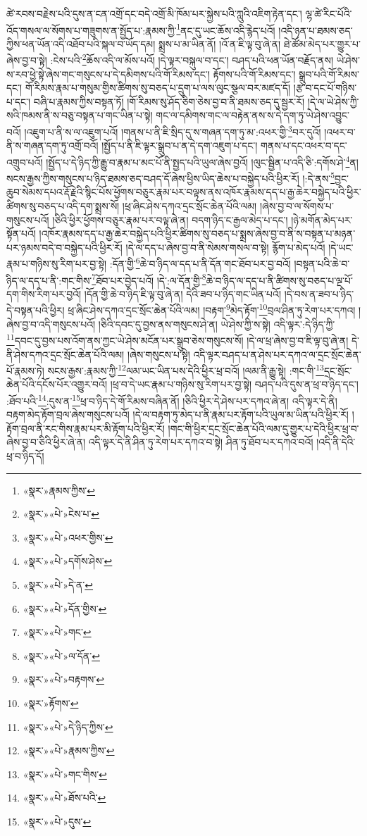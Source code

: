 ཚེ་རབས་བརྗེས་པའི་དུས་ན་ངན་འགྲོ་དང་བདེ་འགྲོ་མི་ཁོམ་པར་སྐྱེས་པའི་ཀླུའི་འཇིག་རྟེན་དང་། ལྷ་ཚེ་རིང་པོའི་འོད་གསལ་ལ་སོགས་པ་གཟུགས་ན་སྤྱོད་པ་:རྣམས་ཀྱི་\footnote{«སྣར་»རྣམས་ཀྱིས་}ནང་དུ་ཡང་ཆོས་འདི་རྙེད་པའོ། །འདི་ཉན་པ་ཐམས་ཅད་ཀྱིས་ཕན་ཡོན་འདི་འཐོབ་པའི་སྐལ་བ་ཡོད་དམ། སྨྲས་པ་མ་ཡིན་ནོ། །འོ་ན་ཇི་ལྟ་བུ་ཞེ་ན། ཐེ་ཚོམ་མེད་པར་གྱུར་པ་ཞེས་བྱ་བ་སྟེ། :ངེས་པའི་\footnote{«སྣར་»«པེ་»ངེས་པ་}ཆོས་འདི་ལ་མོས་པའོ། །དེ་ལྟར་བསྐུལ་བ་དང་། བཤད་པའི་ཕན་ཡོན་བརྗོད་ནས། ཡེ་ཤེས་ས་རབ་ཕྱེ་སྟེ་ཞེས་གང་གསུངས་པ་དེ་དམིགས་པའི་གོ་རིམས་དང་། རྟོགས་པའི་གོ་རིམས་དང་། སྒྲུབ་པའི་གོ་རིམས་དང་། གོ་རིམས་རྣམ་པ་གསུམ་གྱིས་ཚིགས་སུ་བཅད་པ་དྲུག་པ་ལས་ལུང་སྩལ་བར་མཛད་དོ། །རྩ་བ་དང་པོ་གཉིས་པ་དང་། བཞི་པ་རྣམས་ཀྱིས་བསྟན་ཏོ། །གོ་རིམས་སུ་ཤོད་ཅིག་ཅེས་བྱ་བ་ནི་ཐམས་ཅད་དུ་སྦྱར་རོ། །དེ་ལ་ཡེ་ཤེས་ཀྱི་སའི་ཁམས་ནི་ས་བཅུ་བསྟན་པ་གང་ཡིན་པ་སྟེ། གང་ལ་དམིགས་གང་ལ་བརྟེན་ནས་ས་དེ་དག་ཏུ་ཡེ་ཤེས་འབྱུང་བའོ། །འཇུག་པ་ནི་ས་ལ་འཇུག་པའོ། །གནས་པ་ནི་ཇི་སྲིད་དུ་ས་གཞན་དག་ཏུ་མ་:འཕར་གྱི་\footnote{«སྣར་»«པེ་»འཕར་གྱིས་}བར་དུའོ། །འཕར་བ་ནི་ས་གཞན་དག་ཏུ་འགྲོ་བའོ། །སྤྱོད་པ་ནི་ཇི་ལྟར་སྒྲུབ་པ་ན་དེ་དག་འཇུག་པ་དང་། གནས་པ་དང་འཕར་བ་དང་འགྲུབ་པའོ། །སྤྱོད་པ་དེ་ཉིད་ཀྱི་རྒྱུ་བ་རྣམ་པ་མང་པོ་ནི་སྤྱད་པའི་ཡུལ་ཞེས་བྱའོ། །ལུང་སྦྱིན་པ་འདི་ཅི་:དགོས་ཤེ་\footnote{«སྣར་»«པེ་»དགོས་ཤེས་}ན། སངས་རྒྱས་ཀྱིས་གསུངས་པ་ཉིད་ཐམས་ཅད་བཤད་དོ་ཞེས་ཕྱིས་ཡིད་ཆེས་པ་བསྐྱེད་པའི་ཕྱིར་རོ། །:དེ་ནས་\footnote{«སྣར་»«པེ་»དེ་ན་}བྱང་ཆུབ་སེམས་དཔའ་རྡོ་རྗེའི་སྙིང་པོས་ཕྱོགས་བཅུར་རྣམ་པར་བལྟས་ནས་འཁོར་རྣམས་དད་པ་རྒྱ་ཆེར་བསྐྱེད་པའི་ཕྱིར་ཚིགས་སུ་བཅད་པ་འདི་དག་སྨྲས་སོ། །ཕྲ་ཞིང་ཤེས་དཀའ་དྲང་སྲོང་ཆེན་པོའི་ལམ། །ཞེས་བྱ་བ་ལ་སོགས་པ་གསུངས་པའོ། །ཅིའི་ཕྱིར་ཕྱོགས་བཅུར་རྣམ་པར་བལྟ་ཞེ་ན། བདག་ཉིད་ང་རྒྱལ་མེད་པ་དང་། །ཉེ་མགོན་མེད་པར་སྟོན་པའོ། །འཁོར་རྣམས་དད་པ་རྒྱ་ཆེར་བསྐྱེད་པའི་ཕྱིར་ཚིགས་སུ་བཅད་པ་སྨྲས་ཞེས་བྱ་བ་ནི་ས་བསྟན་པ་མཉན་པར་ཉམས་བདེ་བ་བསྐྱེད་པའི་ཕྱིར་རོ། །དེ་ལ་དད་པ་ཞེས་བྱ་བ་ནི་སེམས་གསལ་བ་སྟེ། རྙོག་པ་མེད་པའོ། །དེ་ཡང་རྣམ་པ་གཉིས་སུ་རིག་པར་བྱ་སྟེ། :དོན་གྱི་\footnote{«སྣར་»«པེ་»དོན་གྱིས་}ཆེ་བ་ཉིད་ལ་དད་པ་ནི་དོན་གང་ཐོབ་པར་བྱ་བའོ། །བསྟན་པའི་ཆེ་བ་ཉིད་ལ་དད་པ་ནི་:གང་གིས་\footnote{«སྣར་»«པེ་»གང་}ཐོབ་པར་བྱེད་པའོ། །དེ་:ལ་དོན་གྱི་\footnote{«སྣར་»«པེ་»ལ་དོན་}ཆེ་བ་ཉིད་ལ་དད་པ་ནི་ཚིགས་སུ་བཅད་པ་ལྔ་པོ་དག་གིས་རིག་པར་བྱའོ། །དོན་གྱི་ཆེ་བ་ཉིད་ཇི་ལྟ་བུ་ཞེ་ན། དེའི་ཟབ་པ་ཉིད་གང་ཡིན་པའོ། །དེ་བས་ན་ཟབ་པ་ཉིད་དེ་བསྟན་པའི་ཕྱིར། ཕྲ་ཞིང་ཤེས་དཀའ་དྲང་སྲོང་ཆེན་པོའི་ལམ། །བརྟག་\footnote{«སྣར་»«པེ་»བརྟགས་}མེད་རྟོག་\footnote{«སྣར་»རྟོགས་}བྲལ་ཤིན་ཏུ་རེག་པར་དཀའ། །ཞེས་བྱ་བ་འདི་གསུངས་པའོ། །ཅིའི་དབང་དུ་བྱས་ནས་གསུངས་ཤེ་ན། ཡེ་ཤེས་ཀྱི་ས་སྟེ། འདི་ལྟར་:དེ་ཉིད་ཀྱི་\footnote{«སྣར་»«པེ་»དེ་ཉིད་ཀྱིས་}དབང་དུ་བྱས་པས་འོག་ནས་ཀྱང་ཡེ་ཤེས་མངོན་པར་སྒྲུབ་ཅེས་གསུངས་སོ། །དེ་ལ་ཕྲ་ཞེས་བྱ་བ་ཇི་ལྟ་བུ་ཞེ་ན། དེ་ནི་ཤེས་དཀའ་དྲང་སྲོང་ཆེན་པོའི་ལམ། །ཞེས་གསུངས་པ་སྟེ། འདི་ལྟར་བཤད་པ་ན་ཤེས་པར་དཀའ་ལ་དྲང་སྲོང་ཆེན་པོ་རྣམས་ཏེ། སངས་རྒྱས་:རྣམས་ཀྱི་\footnote{«སྣར་»«པེ་»རྣམས་ཀྱིས་}ལམ་ཡང་ཡིན་པས་དེའི་ཕྱིར་ཕྲ་བའོ། །ལམ་ནི་རྒྱུ་སྟེ། :གང་གི་\footnote{«སྣར་»«པེ་»གང་གིས་}དྲང་སྲོང་ཆེན་པོའི་དངོས་པོར་འགྱུར་བའོ། །ཕྲ་བ་དེ་ཡང་རྣམ་པ་གཉིས་སུ་རིག་པར་བྱ་སྟེ། བཤད་པའི་དུས་ན་ཕྲ་བ་ཉིད་དང་། :ཐོབ་པའི་\footnote{«སྣར་»«པེ་»ཐོས་པའི་}:དུས་ན་\footnote{«སྣར་»«པེ་»དུས་}ཕྲ་བ་ཉིད་དེ་གོ་རིམས་བཞིན་ནོ། །ཅིའི་ཕྱིར་དེ་ཤེས་པར་དཀའ་ཞེ་ན། འདི་ལྟར་དེ་ནི། བརྟག་མེད་རྟོག་བྲལ་ཞེས་གསུངས་པའོ། །དེ་ལ་བརྟག་ཏུ་མེད་པ་ནི་རྣམ་པར་རྟོག་པའི་ཡུལ་མ་ཡིན་པའི་ཕྱིར་རོ། །རྟོག་བྲལ་ནི་རང་གིས་རྣམ་པར་མི་རྟོག་པའི་ཕྱིར་རོ། །གང་གི་ཕྱིར་དྲང་སྲོང་ཆེན་པོའི་ལམ་དུ་གྱུར་པ་དེའི་ཕྱིར་ཕྲ་བ་ཞེས་བྱ་བ་ཅིའི་ཕྱིར་ཞེ་ན། འདི་ལྟར་དེ་ནི་ཤིན་ཏུ་རེག་པར་དཀའ་བ་སྟེ། ཤིན་ཏུ་ཐོབ་པར་དཀའ་བའོ། །འདི་ནི་དེའི་ཕྲ་བ་ཉིད་དོ། 